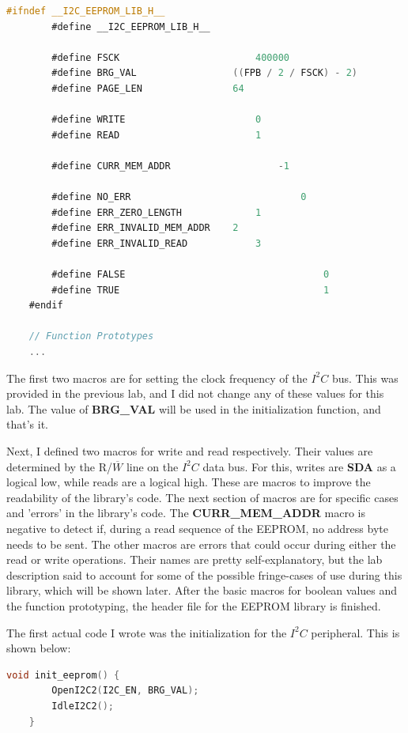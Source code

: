 \documentclass[a4paper, 12pt]{article}
\begin{document}
	\begin{mdframed}[backgroundcolor=code-gray, roundcorner=10pt,
								innerleftmargin=5, innertopmargin=5, innerbottommargin=5]	
	\begin{lstlisting}[language=C, caption=EEPROM Library Header File, tabsize=2]
	#ifndef __I2C_EEPROM_LIB_H__
		#define __I2C_EEPROM_LIB_H__

		#define FSCK						400000
		#define BRG_VAL					((FPB / 2 / FSCK) - 2)
		#define PAGE_LEN				64

		#define WRITE						0
		#define READ						1

		#define CURR_MEM_ADDR					-1
		
		#define NO_ERR								0
		#define ERR_ZERO_LENGTH				1
		#define ERR_INVALID_MEM_ADDR	2
		#define ERR_INVALID_READ			3

		#define FALSE									0
		#define TRUE									1
	#endif

	// Function Prototypes
	...
	\end{lstlisting}
	\end{mdframed}
	
The first two macros are for setting the clock frequency of the $I^2C$ bus. This was provided in the previous lab, and I did not change any of these values for this lab. The value of \textbf{BRG\_VAL} will be used in the initialization function, and that's it.

Next, I defined two macros for write and read respectively. Their values are determined by the R/$\overline{W}$ line on the $I^2C$ data bus. For this, writes are \textbf{SDA} as a logical low, while reads are a logical high. These are macros to improve the readability of the library's code. The next section of macros are for specific cases and 'errors' in the library's code. The \textbf{CURR\_MEM\_ADDR} macro is negative to detect if, during a read sequence of the EEPROM, no address byte needs to be sent. The other macros are errors that could occur during either the read or write operations. Their names are pretty self-explanatory, but the lab description said to account for some of the possible fringe-cases of use during this library, which will be shown later. After the basic macros for boolean values and the function prototyping, the header file for the EEPROM library is finished.

\newpage
The first actual code I wrote was the initialization for the $I^2C$ peripheral. This is shown below:

	\begin{mdframed}[backgroundcolor=code-gray, roundcorner=10pt,
								innerleftmargin=5, innertopmargin=5, innerbottommargin=5]	
	\begin{lstlisting}[language=C, caption=$I^2C$ EEPROM Initialization Function, tabsize=2]
	void init_eeprom() {
		OpenI2C2(I2C_EN, BRG_VAL);
		IdleI2C2();
	}
	\end{lstlisting}
	\end{mdframed}
	
\end{document}
